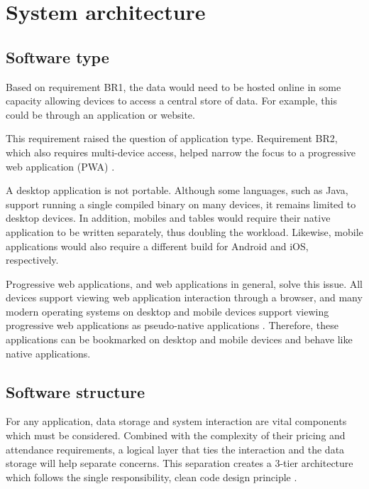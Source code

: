 
\section{System architecture}

\subsection{Software type}
Based on requirement BR1, the data would need to be hosted online in some capacity allowing devices to access a central store of data. For example, this could be through an application or website.

This requirement raised the question of application type. Requirement BR2, which also requires multi-device access, helped narrow the focus to a progressive web application (PWA) \parencite{tandel_impact_2018}.

A desktop application is not portable. Although some languages, such as Java, support running a single compiled binary on many devices, it remains limited to desktop devices. In addition, mobiles and tables would require their native application to be written separately, thus doubling the workload. Likewise, mobile applications would also require a different build for Android and iOS, respectively.

Progressive web applications, and web applications in general, solve this issue. All devices support viewing web application interaction through a browser, and many modern operating systems on desktop and mobile devices support viewing progressive web applications as pseudo-native applications \parencite{biorn-hansen_progressive_2017}. Therefore, these applications can be bookmarked on desktop and mobile devices and behave like native applications.


\subsection{Software structure}
For any application, data storage and system interaction are vital components which must be considered. Combined with the complexity of their pricing and attendance requirements, a logical layer that ties the interaction and the data storage will help separate concerns. This separation creates a 3-tier architecture \parencite{fernandez_secure_2008} which follows the single responsibility, clean code design principle \parencite{martin_clean_2008}.

